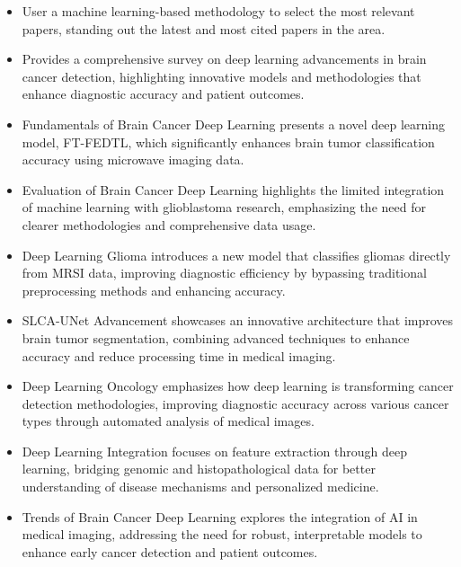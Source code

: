 \documentclass[runningheads]{llncs}
\begin{document}
\begin{itemize}[label=\textbullet]
    \item User a machine learning-based methodology to select the most relevant papers, standing out the latest and most cited papers in the area.
    \item Provides a comprehensive survey on deep learning advancements in brain cancer detection, highlighting innovative models and methodologies that enhance diagnostic accuracy and patient outcomes.
    \item Fundamentals of Brain Cancer Deep Learning presents a novel deep learning model, FT-FEDTL, which significantly enhances brain tumor classification accuracy using microwave imaging data.
    \item Evaluation of Brain Cancer Deep Learning highlights the limited integration of machine learning with glioblastoma research, emphasizing the need for clearer methodologies and comprehensive data usage.
    \item Deep Learning Glioma introduces a new model that classifies gliomas directly from MRSI data, improving diagnostic efficiency by bypassing traditional preprocessing methods and enhancing accuracy.
    \item SLCA-UNet Advancement showcases an innovative architecture that improves brain tumor segmentation, combining advanced techniques to enhance accuracy and reduce processing time in medical imaging.
    \item Deep Learning Oncology emphasizes how deep learning is transforming cancer detection methodologies, improving diagnostic accuracy across various cancer types through automated analysis of medical images.
    \item Deep Learning Integration focuses on feature extraction through deep learning, bridging genomic and histopathological data for better understanding of disease mechanisms and personalized medicine.
    \item Trends of Brain Cancer Deep Learning explores the integration of AI in medical imaging, addressing the need for robust, interpretable models to enhance early cancer detection and patient outcomes.
\end{itemize}
\end{document}
